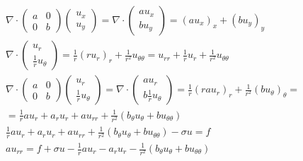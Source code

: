\documentclass[11pt]{article}
\author{Michael}
\title{}
\begin{document}
\[
\begin{array}{l}
\nabla  \cdot \left( {\begin{array}{*{20}{c}}
a&0\\
0&b
\end{array}} \right)\left( \begin{array}{l}
{u_x}\\
{u_y}
\end{array} \right) = \nabla  \cdot \left( \begin{array}{l}
a{u_x}\\
b{u_y}
\end{array} \right) = {\left( {a{u_x}} \right)_x} + {\left( {b{u_y}}
\right)_y}\\
\nabla  \cdot \left( \begin{array}{l}
{u_r}\\
\frac{1}{r}{u_\theta }
\end{array} \right) = \frac{1}{r}{\left( {r{u_r}} \right)_r} +
\frac{1}{{{r^2}}}{u_{\theta \theta }} = {u_{rr}} + \frac{1}{r}{u_r} +
\frac{1}{{{r^2}}}{u_{\theta \theta }}\\
\nabla  \cdot \left( {\begin{array}{*{20}{c}}
a&0\\
0&b
\end{array}} \right)\left( \begin{array}{l}
{u_r}\\
\frac{1}{r}{u_\theta }
\end{array} \right) = \nabla  \cdot \left( \begin{array}{l}
a{u_r}\\
b\frac{1}{r}{u_\theta }
\end{array} \right) = \frac{1}{r}{\left( {ra{u_r}} \right)_r} +
\frac{1}{{{r^2}}}{\left( {b{u_\theta }} \right)_\theta } = \\
= \frac{1}{r}a{u_r} + {a_r}{u_r} + a{u_{rr}} + \frac{1}{{{r^2}}}\left(
{{b_\theta }{u_\theta } + b{u_{\theta \theta }}} \right)\\
\frac{1}{r}a{u_r} + {a_r}{u_r} + a{u_{rr}} + \frac{1}{{{r^2}}}\left( {{b_\theta
}{u_\theta } + b{u_{\theta \theta }}} \right) - \sigma u = f\\
a{u_{rr}} = f + \sigma u - \frac{1}{r}a{u_r} - {a_r}{u_r} -
\frac{1}{{{r^2}}}\left( {{b_\theta }{u_\theta } + b{u_{\theta \theta }}} \right)
\end{array}
\]
\end{document}
